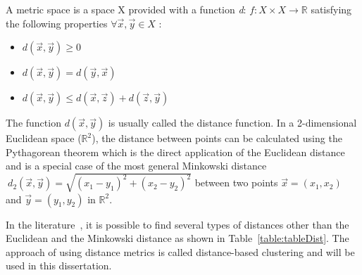     \begin{mydef}
    A metric space is a space X provided with a function \emph{d}:
    \begin{math}
    f: X\times X\rightarrow \mathbb{R}
    \end{math}
    satisfying the following properties \begin{math}\forall \vec{x},\vec{y} \in X \end{math} :

    \begin{itemize}
      \item \begin{math} d(\vec{x},\vec{y}) \geqslant 0 \end{math}
      \item \begin{math} d(\vec{x},\vec{y}) = d(\vec{y},\vec{x}) \end{math}
      \item \begin{math} d(\vec{x},\vec{y}) \leqslant d(\vec{x},\vec{z}) + d(\vec{z},\vec{y}) \end{math}
    \end{itemize}

    \end{mydef}

The function \begin{math} d(\vec{x},\vec{y}) \end{math} is usually called the distance function. In a 2-dimensional Euclidean space ($\mathbb{R}^{2}$), the distance between points can be calculated using the Pythagorean theorem which is the direct application of the Euclidean distance and is a special case of the most general Minkowski distance \begin{math}\ d_{2}(\vec{x},\vec{y}) = \sqrt{(x_{1}-y_{1})^{2}+(x_{2}-y_{2})^{2}} \end{math} between two points $\vec{x}=(x_{1},x_{2})$ and $\vec{y}=(y_{1},y_{2})$ in $\mathbb{R}^{2}$.

In the literature~\cite{Mendelson75introduction}, it is possible to find several types of distances other than the Euclidean and the Minkowski distance as shown in Table~\ref{table:tableDist}. The approach of using distance metrics is called distance-based clustering and will be used in this dissertation.

